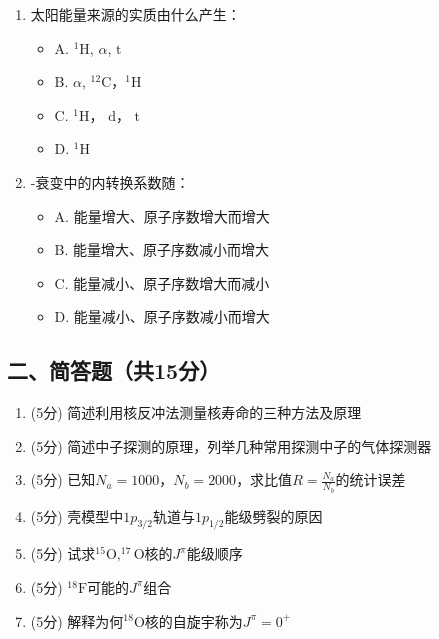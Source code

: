 \documentclass{article}
\begin{document}
\begin{enumerate}[label=\arabic*.]
    \item 太阳能量来源的实质由什么产生：
    \begin{itemize}[label={},leftmargin=2em]
        \item A. $^1\text{H}$, $\alpha$, $\text{t}$
        \item B. $\alpha$, $^{12}\text{C}$，$^1\text{H}$ 
        \item C. $^1\text{H}$， $\text{d}$， $\text{t}$
        \item D. $^1\text{H}$
    \end{itemize}
    
    \item \textbeta-衰变中的内转换系数随：
    \begin{itemize}[label={},leftmargin=2em]
        \item A. 能量增大、原子序数增大而增大 
        \item B. 能量增大、原子序数减小而增大
        \item C. 能量减小、原子序数增大而减小 
        \item D. 能量减小、原子序数减小而增大
    \end{itemize}
\end{enumerate}

\subsection*{二、简答题（共15分）}

\begin{enumerate}[label=\arabic*.]
    \item (5分) 简述利用核反冲法测量核寿命的三种方法及原理
    
    \item (5分) 简述中子探测的原理，列举几种常用探测中子的气体探测器
    
    \item (5分) 已知$N_a=1000$，$N_b=2000$，求比值$R=\frac{N_a}{N_b}$的统计误差
    
    \item (5分) 壳模型中$1p_{3/2}$轨道与$1p_{1/2}$能级劈裂的原因
    
    \item (5分) 试求$^{15}\text{O},^{17}\text{O}$核的$J^{\pi}$能级顺序
    
    \item (5分) $^{18}\text{F}$可能的$J^{\pi}$组合
    
    \item (5分) 解释为何$^{18}\text{O}$核的自旋宇称为$J^{\pi}=0^+$
    
\end{enumerate}
\end{document}
